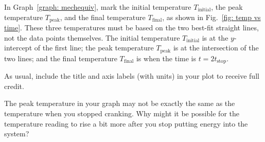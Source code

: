 \documentclass[addpoints]{physlabs}
\begin{document}
\begin{postlab}
{\begin{minipage}{0.5\linewidth}
        In Graph~\ref{graph: mechequiv}, mark the initial temperature $T_\text{initial}$, the peak temperature $T_\text{peak}$, and the final temperature $T_\text{final}$, as shown in Fig.~\ref{fig: temp vs time}. These three temperatures must be based on the two best-fit straight lines, not the data points themselves. The initial temperature $T_\text{initial}$ is at the $y$-intercept of the first line; the peak temperature $T_\text{peak}$ is at the intersection of the two lines; and the final temperature $T_\text{final}$ is when the time is $t=2t_\text{stop}$.
    \end{minipage}
    \hfill
    \begin{minipage}{0.45\linewidth}
        
    \end{minipage}}
    
    As usual, include the title and axis labels (with units) in your plot to receive full credit.\\[1em]

    \begin{center}
        \captionsetup{font=normalsize}
    \end{center}

    \filbreak
    \question[1] The peak temperature in your graph may not be exactly the same as the temperature when you stopped cranking. Why might it be possible for the temperature reading to rise a bit more after you stop putting energy into the system?
    \begin{solution}[1.5cm]
        

\end{solution}
\end{postlab}
\end{document}
